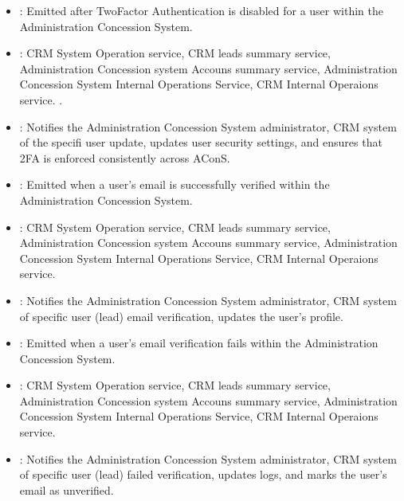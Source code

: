 \documentclass[letterpaper,10pt,english]{sphinxmanual}
\begin{document}
\sphinxAtStartPar
{}
\begin{itemize}
\item {} 
\sphinxAtStartPar
{}: Emitted after Two\sphinxhyphen{}Factor Authentication is disabled for a user within the Administration Concession System.

\item {} 
\sphinxAtStartPar
{}: CRM System Operation service, CRM leads summary service,  Administration Concession system Accouns summary service, Administration Concession System Internal Operations Service, CRM Internal Operaions service. .

\item {} 
\sphinxAtStartPar
{}: Notifies the Administration Concession System administrator, CRM system of the specifi user update, updates user security settings, and ensures that 2FA is enforced consistently across AConS.

\end{itemize}

\sphinxAtStartPar
{}
\begin{itemize}
\item {} 
\sphinxAtStartPar
{}: Emitted when a user’s email is successfully verified within the Administration Concession System.

\item {} 
\sphinxAtStartPar
{}: CRM System Operation service, CRM leads summary service,  Administration Concession system Accouns summary service, Administration Concession System Internal Operations Service, CRM Internal Operaions service.

\item {} 
\sphinxAtStartPar
{}: Notifies the Administration Concession System administrator, CRM system of specific user (lead) email verification, updates the user’s profile.

\end{itemize}

\sphinxAtStartPar
{}
\begin{itemize}
\item {} 
\sphinxAtStartPar
{}: Emitted when a user’s email verification fails within the Administration Concession System.

\item {} 
\sphinxAtStartPar
{}: CRM System Operation service, CRM leads summary service, Administration Concession system Accouns summary service, Administration Concession System Internal Operations Service, CRM Internal Operaions service.

\item {} 
\sphinxAtStartPar
{}: Notifies the Administration Concession System administrator, CRM system of specific user (lead) failed verification, updates logs, and marks the user’s email as unverified.

\end{itemize}
\end{document}
